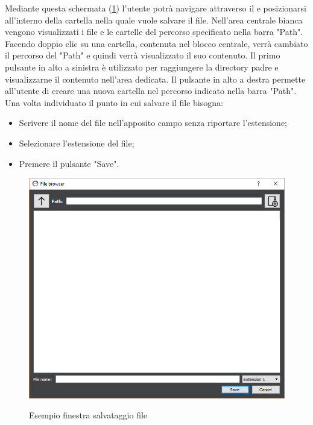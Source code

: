 \documentclass[../AnalisideiRequisiti.tex]{subfiles}
\begin{document}
	
		Mediante questa schermata (\ref{fig:filebrowser-save}) l'utente potrà navigare attraverso il  e posizionarsi all'interno della cartella nella quale vuole salvare il file.
		Nell'area centrale bianca vengono visualizzati i file e le cartelle del percorso specificato nella barra "Path". Facendo doppio clic su una cartella, contenuta nel blocco centrale, verrà cambiato il percorso del "Path" e quindi verrà visualizzato il suo contenuto.
		Il primo pulsante in alto a sinistra è utilizzato per raggiungere la directory padre e visualizzarne il contenuto nell'area dedicata.
		Il pulsante in alto a destra permette all'utente di creare una nuova cartella nel percorso indicato nella barra "Path". 
		Una volta individuato il punto in cui salvare il file bisogna:
		\begin{itemize}
			\item{} Scrivere il nome del file nell'apposito campo senza riportare l'estensione;
			\item{} Selezionare l'estensione del file;
			\item{} Premere il pulsante "Save".
		\end{itemize}
	\begin{figure}[htp]
			\caption{Esempio finestra salvataggio file}
			\centering
			\includegraphics[width=\textwidth]{../img/filebrowser-save.png}
			\label{fig:filebrowser-save}
		\end{figure}
\end{document}
